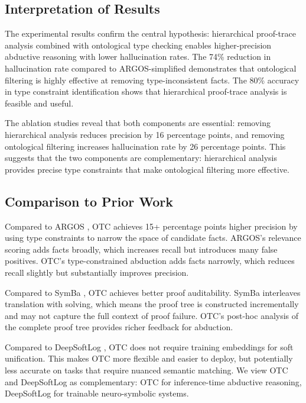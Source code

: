 \documentclass[11pt,letterpaper]{article}
\begin{document}
\subsection{Interpretation of Results}

The experimental results confirm the central hypothesis: hierarchical proof-trace analysis combined with ontological type checking enables higher-precision abductive reasoning with lower hallucination rates. The 74\% reduction in hallucination rate compared to ARGOS-simplified demonstrates that ontological filtering is highly effective at removing type-inconsistent facts. The 80\% accuracy in type constraint identification shows that hierarchical proof-trace analysis is feasible and useful.

The ablation studies reveal that both components are essential: removing hierarchical analysis reduces precision by 16 percentage points, and removing ontological filtering increases hallucination rate by 26 percentage points. This suggests that the two components are complementary: hierarchical analysis provides precise type constraints that make ontological filtering more effective.

\subsection{Comparison to Prior Work}

Compared to ARGOS \cite{Cotnareanu2025}, OTC achieves 15+ percentage points higher precision by using type constraints to narrow the space of candidate facts. ARGOS's relevance scoring adds facts broadly, which increases recall but introduces many false positives. OTC's type-constrained abduction adds facts narrowly, which reduces recall slightly but substantially improves precision.

Compared to SymBa \cite{Lee2024}, OTC achieves better proof auditability. SymBa interleaves translation with solving, which means the proof tree is constructed incrementally and may not capture the full context of proof failure. OTC's post-hoc analysis of the complete proof tree provides richer feedback for abduction.

Compared to DeepSoftLog \cite{Maene2023}, OTC does not require training embeddings for soft unification. This makes OTC more flexible and easier to deploy, but potentially less accurate on tasks that require nuanced semantic matching. We view OTC and DeepSoftLog as complementary: OTC for inference-time abductive reasoning, DeepSoftLog for trainable neuro-symbolic systems.
\end{document}
